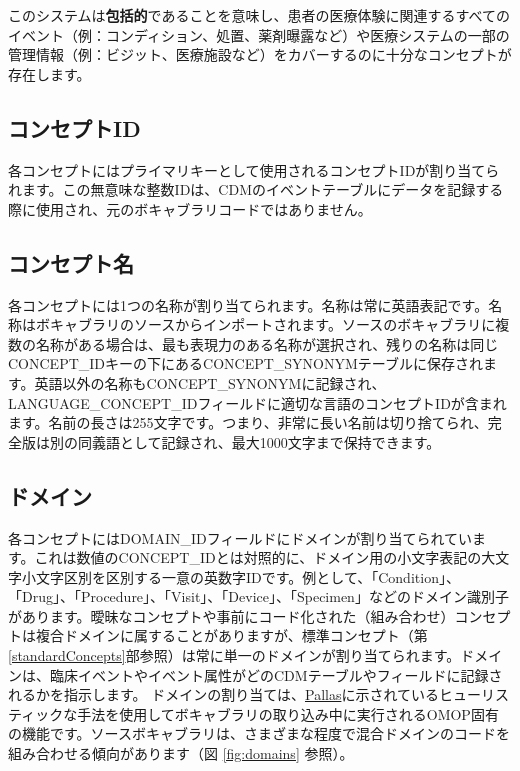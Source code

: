 \documentclass[
  11pt]{book}
\theoremstyle{definition}
\theoremstyle{definition}
\theoremstyle{definition}
\theoremstyle{definition}
\theoremstyle{remark}
\begin{document}
このシステムは\textbf{包括的}であることを意味し、患者の医療体験に関連するすべてのイベント（例：コンディション、処置、薬剤曝露など）や医療システムの一部の管理情報（例：ビジット、医療施設など）をカバーするのに十分なコンセプトが存在します。

\subsection{コンセプトID}\label{ux30b3ux30f3ux30bbux30d7ux30c8id}

各コンセプトにはプライマリキーとして使用されるコンセプトIDが割り当てられます。この無意味な整数IDは、CDMのイベントテーブルにデータを記録する際に使用され、元のボキャブラリコードではありません。 

\subsection{コンセプト名}\label{ux30b3ux30f3ux30bbux30d7ux30c8ux540d}

各コンセプトには1つの名称が割り当てられます。名称は常に英語表記です。名称はボキャブラリのソースからインポートされます。ソースのボキャブラリに複数の名称がある場合は、最も表現力のある名称が選択され、残りの名称は同じCONCEPT\_IDキーの下にあるCONCEPT\_SYNONYMテーブルに保存されます。英語以外の名称もCONCEPT\_SYNONYMに記録され、LANGUAGE\_CONCEPT\_IDフィールドに適切な言語のコンセプトIDが含まれます。名前の長さは255文字です。つまり、非常に長い名前は切り捨てられ、完全版は別の同義語として記録され、最大1000文字まで保持できます。

\subsection{ドメイン}\label{conceptDomains}

各コンセプトにはDOMAIN\_IDフィールドにドメインが割り当てられています。これは数値のCONCEPT\_IDとは対照的に、ドメイン用の小文字表記の大文字小文字区別を区別する一意の英数字IDです。例として、「Condition」、「Drug」、「Procedure」、「Visit」、「Device」、「Specimen」などのドメイン識別子があります。曖昧なコンセプトや事前にコード化された（組み合わせ）コンセプトは複合ドメインに属することがありますが、標準コンセプト（第\ref{standardConcepts}部参照）は常に単一のドメインが割り当てられます。ドメインは、臨床イベントやイベント属性がどのCDMテーブルやフィールドに記録されるかを指示します。 ドメインの割り当ては、\href{https://github.com/ohDSI/vocabulary-v5.0}{Pallas}に示されているヒューリスティックな手法を使用してボキャブラリの取り込み中に実行されるOMOP固有の機能です。ソースボキャブラリは、さまざまな程度で混合ドメインのコードを組み合わせる傾向があります（図 \ref{fig:domains} 参照）。
\end{document}
